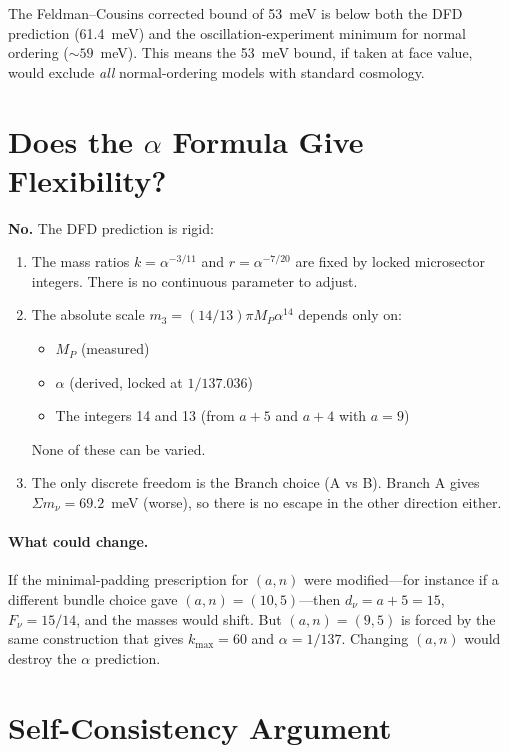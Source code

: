 \documentclass[11pt,a4paper]{article}
\begin{document}
The Feldman--Cousins corrected bound of 53~meV is below both the DFD
prediction (61.4~meV) and the oscillation-experiment minimum for normal
ordering ($\sim 59$~meV). This means the 53~meV bound, if taken at face
value, would exclude \emph{all} normal-ordering models with standard
cosmology.

\section{Does the $\alpha$ Formula Give Flexibility?}

\textbf{No.} The DFD prediction is rigid:
\begin{enumerate}
\item The mass ratios $k = \alpha^{-3/11}$ and $r = \alpha^{-7/20}$ are
  fixed by locked microsector integers. There is no continuous parameter
  to adjust.

\item The absolute scale $m_3 = (14/13)\pi M_P \alpha^{14}$ depends only
  on:
  \begin{itemize}
  \item $M_P$ (measured)
  \item $\alpha$ (derived, locked at $1/137.036$)
  \item The integers 14 and 13 (from $a + 5$ and $a + 4$ with $a = 9$)
  \end{itemize}
  None of these can be varied.

\item The only discrete freedom is the Branch choice (A vs B). Branch A
  gives $\Sigma m_\nu = 69.2$~meV (worse), so there is no escape in the
  other direction either.
\end{enumerate}

\paragraph{What could change.}
If the minimal-padding prescription for $(a, n)$ were modified---for
instance if a different bundle choice gave $(a, n) = (10, 5)$---then
$d_\nu = a + 5 = 15$, $F_\nu = 15/14$, and the masses would shift. But
$(a, n) = (9, 5)$ is forced by the same construction that gives
$k_{\max} = 60$ and $\alpha = 1/137$. Changing $(a, n)$ would destroy the
$\alpha$ prediction.

\section{Self-Consistency Argument}
\end{document}
